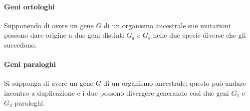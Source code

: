 \paragraph{Geni ortologhi}
Supponendo di avere un gene $G$ di un organismo ancestrale sue mutazioni possono dare origine a due geni distinti $G_a$ e $G_b$ nelle due specie diverse che gli succedono.
\paragraph{Geni paraloghi}
Si supponga di avere un gene $G$ di un organismo ancestrale: questo pu\`o andare incontro a duplicazione e i due possono divergere generando cos\`i due geni $G_1$ e $G_2$ paraloghi.
